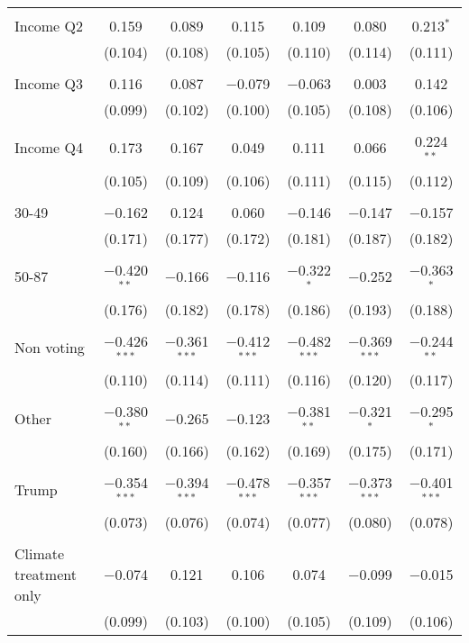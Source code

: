 \begin{tabular}{@{\extracolsep{5pt}}lcccccc}
  & & & & & & \\ 
 Income Q2 & 0.159 & 0.089 & 0.115 & 0.109 & 0.080 & 0.213$^{*}$ \\ 
  & (0.104) & (0.108) & (0.105) & (0.110) & (0.114) & (0.111) \\ 
  & & & & & & \\ 
 Income Q3 & 0.116 & 0.087 & $-$0.079 & $-$0.063 & 0.003 & 0.142 \\ 
  & (0.099) & (0.102) & (0.100) & (0.105) & (0.108) & (0.106) \\ 
  & & & & & & \\ 
 Income Q4 & 0.173 & 0.167 & 0.049 & 0.111 & 0.066 & 0.224$^{**}$ \\ 
  & (0.105) & (0.109) & (0.106) & (0.111) & (0.115) & (0.112) \\ 
  & & & & & & \\ 
 30-49 & $-$0.162 & 0.124 & 0.060 & $-$0.146 & $-$0.147 & $-$0.157 \\ 
  & (0.171) & (0.177) & (0.172) & (0.181) & (0.187) & (0.182) \\ 
  & & & & & & \\ 
 50-87 & $-$0.420$^{**}$ & $-$0.166 & $-$0.116 & $-$0.322$^{*}$ & $-$0.252 & $-$0.363$^{*}$ \\ 
  & (0.176) & (0.182) & (0.178) & (0.186) & (0.193) & (0.188) \\ 
  & & & & & & \\ 
 Non voting & $-$0.426$^{***}$ & $-$0.361$^{***}$ & $-$0.412$^{***}$ & $-$0.482$^{***}$ & $-$0.369$^{***}$ & $-$0.244$^{**}$ \\ 
  & (0.110) & (0.114) & (0.111) & (0.116) & (0.120) & (0.117) \\ 
  & & & & & & \\ 
 Other & $-$0.380$^{**}$ & $-$0.265 & $-$0.123 & $-$0.381$^{**}$ & $-$0.321$^{*}$ & $-$0.295$^{*}$ \\ 
  & (0.160) & (0.166) & (0.162) & (0.169) & (0.175) & (0.171) \\ 
  & & & & & & \\ 
 Trump & $-$0.354$^{***}$ & $-$0.394$^{***}$ & $-$0.478$^{***}$ & $-$0.357$^{***}$ & $-$0.373$^{***}$ & $-$0.401$^{***}$ \\ 
  & (0.073) & (0.076) & (0.074) & (0.077) & (0.080) & (0.078) \\ 
  & & & & & & \\ 
 Climate treatment only & $-$0.074 & 0.121 & 0.106 & 0.074 & $-$0.099 & $-$0.015 \\ 
  & (0.099) & (0.103) & (0.100) & (0.105) & (0.109) & (0.106) \\ 

\end{tabular}
